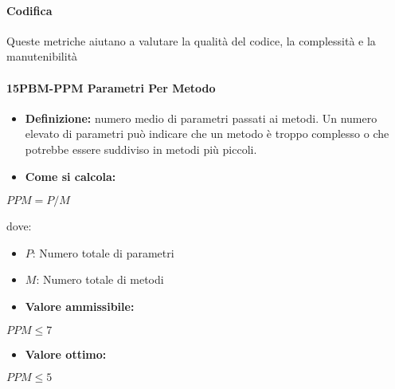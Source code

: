 \paragraph{Codifica}
Queste metriche aiutano a valutare la qualità del codice, la complessità e la manutenibilità

\paragraph*{15PBM-PPM Parametri Per Metodo}
\begin{itemize}
    \item \textbf{Definizione:} numero medio di parametri passati ai metodi. Un numero elevato di parametri può indicare che un metodo è troppo complesso o che potrebbe essere suddiviso in metodi più piccoli.
    \item \textbf{Come si calcola:}
\end{itemize}
\begin{center}
   $PPM = P/M$ 
\end{center}
dove:
\begin{itemize}[label=$\rightarrow$]
    \item $P$: Numero totale di parametri
    \item $M$: Numero totale di metodi
\end{itemize}
\begin{itemize}
    \item \textbf{Valore ammissibile:}
\end{itemize}
\begin{center}
    $PPM \leq 7$
\end{center}
\begin{itemize}
    \item \textbf{Valore ottimo:}
\end{itemize}
\begin{center}
    $PPM \leq 5$
\end{center}


